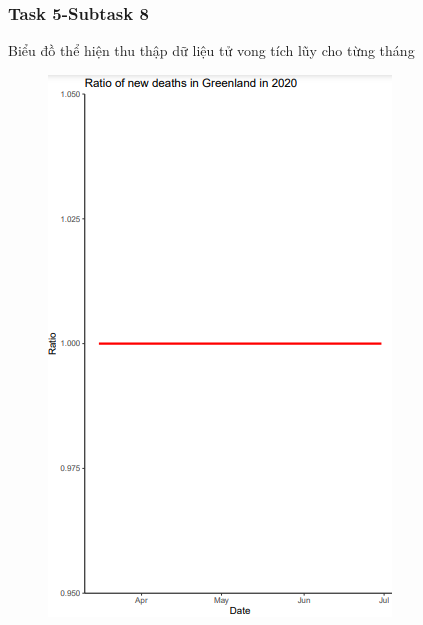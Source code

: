 \documentclass[english,10pt,table]{beamer}
\begin{document}
\frame
{
    \frametitle{Task 5-Subtask 8}
    \begin{block}{Biểu đồ thể hiện thu thập dữ liệu tử vong tích lũy cho từng tháng}
    \begin{figure}[H]
		\centering
		\includegraphics[scale=0.5]{images/5.8.2.png}
	\end{figure}
    \end{block}
}
\frame
\end{document}
